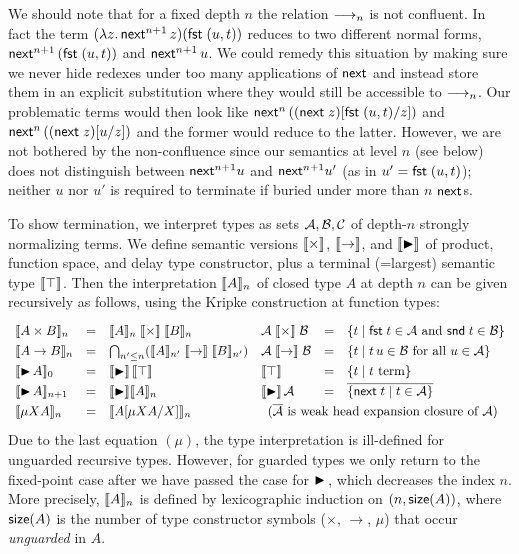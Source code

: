 We should note that for a fixed depth $n$ the relation $\red_n$ is not
confluent. In fact the term $(\lambda z. \, \tnext^{n+1} \, z) (\fst (u , t))$
reduces to two different normal forms, $\tnext^{n+1} \, (\fst (u , t))$ and $\tnext^{n+1} \, u$.
We could remedy this situation by making sure we never hide redexes
under too many applications of $\tnext$ and instead store them in an explicit
substitution where they would still be accessible to $\red_n$.
Our problematic terms would then look like $\tnext^{n} \, (\subst {\fst (u , t)} z {(\pure z)})$
and $\tnext^{n} \, (\subst u z {(\pure z)})$ and the former would reduce
to the latter.
However, we are not bothered by the non-confluence since our semantics
at level $n$ (see below) does not distinguish between $\tnext^{n+1} u$ and
$\tnext^{n+1} u'$ (as in $u' = \fst (u,t)$); neither $u$ nor $u'$ is
required to terminate if buried under more than $n$ $\tnext$s.


To show termination, we interpret types as sets $\A,\B,\C$ of
depth-$n$ strongly normalizing terms.
We define semantic versions $\semtimes$,
$\semto$, and $\semlater$ of product, function space, and delay type
constructor, plus a terminal (=largest) semantic type $\semtop$.  Then
the interpretation $\Den A n$ of closed type $A$ at depth $n$ can be given
recursively as follows, using the Kripke construction at function types:
\[
\def\arraystretch{1.3}
\begin{array}{lll@{\quad}lll}
  \Den{A \times B}n & = & \Den A n \semtimes \Den B n
  &
  \A \semtimes \B & = & \{ t \mid \fst t \in \A \mand \snd t \in \B \}
\\
  \Den{A \to B}n & = & \bigcap_{n' \leq n} (\Den A {n'} \semto \Den B {n'})
  &
  \A \semto \B & = & \{ t \mid t\,u \in \B \mforall u \in \A \}
\\
  \Den{\later A}0 & = & \semlater \semtop
  &
  \semtop & = & \{ t \mid t \mbox{ term} \}
\\
  \Den{\later A}{n+1} & = & \semlater \Den A n
  &
  \semlater \A & = & \overline{\{ \pure t \mid t \in \A \}}
\\
  \Den{\mu X A}n & = & \Den{\subst{\mu X A}X A}n
  &
  \multicolumn 3 l {(\overline\A \mbox{ is weak head expansion closure
      of } \A)}
\\
\end{array}
\]
%
Due to the last equation $(\mu)$, the type interpretation is ill-defined for
unguarded recursive types.  However, for guarded types we only return
to the fixed-point case after we have passed the case for $\later$,
which decreases the index $n$.  More precisely, $\Den A n$ is defined by
lexicographic induction on $(n, \tsize(A))$, where $\tsize(A)$ is the
number of type constructor symbols ($\times$, $\to$, $\mu$)
that occur \emph{unguarded} in $A$.

